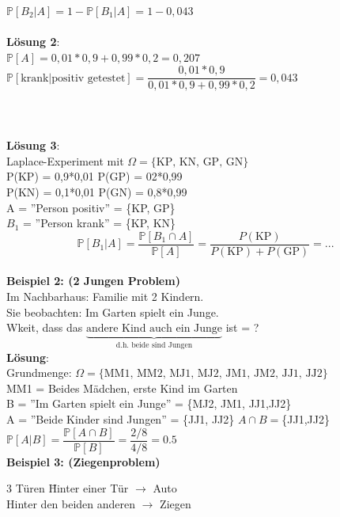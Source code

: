 $\mathds{P}[B_2 \vert A] = 1- \mathds{P}[B_1 \vert A ] = 1-0,043$\\\\
\textbf{Lösung 2}:\\ 
$\mathds{P}[A] = 0,01*0,9+0,99*0,2 = 0,207$\medskip\\
$\mathds{P}[\text{krank}\vert \text{positiv getestet}]= \dfrac{0,01*0,9}{0,01*0,9+0,99*0,2} = 0,043$\\\\\\\\
\textbf{Lösung 3}:\\
Laplace-Experiment mit $\Omega = \{\text{KP, KN, GP, GN}\}$\\
P(KP) = 0,9*0,01 \hspace{2cm} P(GP) = 02*0,99\\
P(KN) = 0,1*0,01 \hspace{2cm} P(GN) = 0,8*0,99\smallskip\\
A = ''Person positiv'' = \{KP, GP\}\\
$B_1$ = ''Person krank'' =  \{KP, KN\} 
$$\mathds{P}[B_1\vert A] = \dfrac{\mathds{P}[B_1 \cap A]}{\mathds{P}[A]} = \dfrac{P(\text{KP})}{P(\text{KP})+P(\text{GP})} = ...$$\medskip\\
\textbf{Beispiel 2: (2 Jungen Problem)}\\
Im Nachbarhaus: Familie mit 2 Kindern.\\
Sie beobachten: Im Garten spielt ein Junge.\\
Wkeit, dass das $\underbrace{\text{andere Kind auch ein Junge}}_\text{d.h. beide sind Jungen}$ ist = ?\smallskip\\
\textbf{Lösung}:\\
Grundmenge: $\Omega = \{\text{MM1, MM2, MJ1, MJ2, JM1, JM2, JJ1, JJ2}\}$\\
MM1 = Beides Mädchen, erste Kind im Garten\smallskip\\
B = ''Im Garten spielt ein Junge'' = \{MJ2, JM1, JJ1,JJ2\}\\
A = ''Beide Kinder sind Jungen'' = \{JJ1, JJ2\} \hspace{1cm} $A\cap B = $\{JJ1,JJ2\}\medskip\\
$\mathds{P}[A\vert B] = \dfrac{\mathds{P}[A \cap B]}{\mathds{P}[B]} = \dfrac{2/8}{4/8} = 0.5$\bigskip\\
\textbf{Beispiel 3: (Ziegenproblem)}
\begin{tabbing}
	3 Türen \hspace{1cm} \= Hinter einer Tür $\rightarrow$ Auto\\
	\> Hinter den beiden anderen $\rightarrow$ Ziegen
\end{tabbing}
